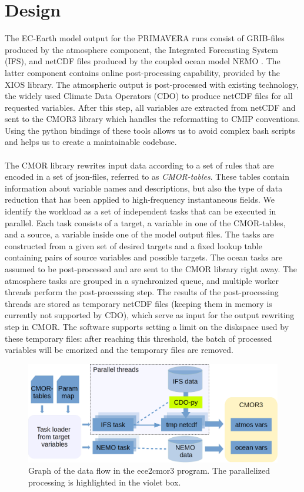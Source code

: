 \documentclass[a4paper,10pt]{article}
\begin{document}
\section{Design}
The EC-Earth model output for the PRIMAVERA runs consist of GRIB-files produced 
by the atmosphere component, the Integrated Forecasting System (IFS), and 
netCDF files produced by the coupled ocean model NEMO \cite{NEMO}. The latter 
component 
contains online post-processing capability, provided by the XIOS library. The 
atmospheric output is post-processed with existing technology, the widely used 
Climate Data Operators (CDO) \cite{CDO} to produce netCDF files for all 
requested 
variables. After this step, all variables are extracted from netCDF and sent to 
the CMOR3 library \cite{CMOR} which handles the reformatting to CMIP 
conventions. Using the 
python bindings of these tools allows us to avoid complex bash scripts and 
helps us to create a maintainable codebase.\\
\\
The CMOR library rewrites input data according to a set of rules that are 
encoded in a set of json-files, referred to as \emph{CMOR-tables}. These tables 
contain information about variable names and descriptions, but also the type of 
data reduction that has been applied to high-frequency instantaneous fields. We 
identify the workload as a set of independent tasks that can be executed in 
parallel. Each task consists of a target, a variable in one of the CMOR-tables, 
and a source, a variable inside one of the model output files. The tasks are 
constructed from a given set of desired targets and a fixed lookup table 
containing pairs of source variables and possible targets. The ocean tasks 
are assumed to be post-processed and are sent to the CMOR library right away. 
The atmosphere tasks are grouped in a synchronized queue, and multiple worker 
threads perform the post-processing step. The results of the post-processing 
threads are stored as temporary netCDF files (keeping them in memory is 
currently not supported by CDO), which serve as input for the output rewriting 
step in CMOR. The software supports setting a limit on the diskspace used by 
these temporary files: after reaching this threshold, the batch of processed 
variables will be cmorized and the temporary files are removed.\\
\begin{figure}[ht]
 \centering
 \includegraphics[width=\textwidth,clip]{ece2cmor3flowv3.png}
 \caption{Graph of the data flow in the ece2cmor3 program. The parallelized 
processing is highlighted in the violet box.}
\end{figure}
\end{document}
